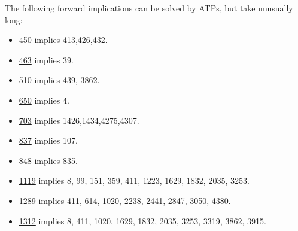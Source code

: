 The following forward implications can be solved by ATPs, but take unusually long:
\begin{itemize}
\item \href{https://teorth.github.io/equational_theories/implications/?450}{450} implies 413,426,432.
\item \href{https://teorth.github.io/equational_theories/implications/?463}{463} implies 39.
\item \href{https://teorth.github.io/equational_theories/implications/?510}{510} implies 439, 3862.
\item \href{https://teorth.github.io/equational_theories/implications/?650}{650} implies 4.
\item \href{https://teorth.github.io/equational_theories/implications/?703}{703} implies 1426,1434,4275,4307.
\item \href{https://teorth.github.io/equational_theories/implications/?837}{837} implies 107.
\item \href{https://teorth.github.io/equational_theories/implications/?848}{848} implies 835.
\item \href{https://teorth.github.io/equational_theories/implications/?1119}{1119} implies 8, 99, 151, 359, 411, 1223, 1629, 1832, 2035, 3253.
\item \href{https://teorth.github.io/equational_theories/implications/?1289}{1289} implies 411, 614, 1020, 2238, 2441, 2847, 3050, 4380.
\item \href{https://teorth.github.io/equational_theories/implications/?1312}{1312} implies 8, 411, 1020, 1629, 1832, 2035, 3253, 3319, 3862, 3915.
\end{itemize}

